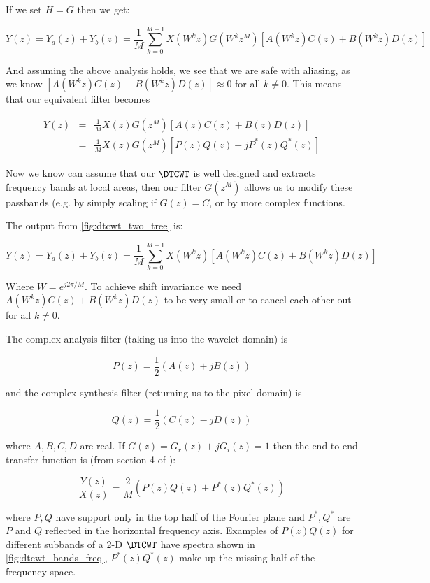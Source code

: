 If we set $H=G$ then we get:

$$Y(z) = Y_{a}(z) + Y_{b}(z) = \frac{1}{M} \sum_{k=0}^{M-1} X(W^k z)G(W^kz^{M}) [A(W^kz)C(z) + B(W^kz)D(z)]$$

And assuming the above analysis holds, we see that we are safe with aliasing, as
we know $[A(W^kz)C(z) + B(W^kz)D(z)] \approx 0$ for all $k\neq 0$. This means
that our equivalent filter becomes

\begin{eqnarray}
  Y(z) &=& \frac{1}{M} X(z)G(z^{M}) [A(z)C(z) + B(z)D(z)] \\
  &=& \frac{1}{M} X(z)G(z^{M}) [P(z)Q(z) + jP^{*}(z)Q^{*}(z)]
\end{eqnarray}

Now we know can assume that our $\DTCWT$ is well designed and extracts frequency
bands at local areas, then our filter $G(z^{M})$ allows us to modify these
passbands (e.g. by simply scaling if $G(z) = C$, or by more complex functions.


The output from \autoref{fig:dtcwt_two_tree} is:

$$ Y(z) = Y_a(z) + Y_b(z) = \frac{1}{M}\sum_{k=0}^{M-1} X\left(W^k z\right)
  \left[ A\left(W^kz\right)C(z) + B\left(W^kz\right)D(z) \right] $$

Where $W=e^{j2\pi/M}$.  To achieve shift invariance we need 
$A\left(W^kz\right)C(z) + B\left(W^kz\right)D(z)$ to be very small or to cancel
each other out for all $k \neq 0$.

The complex analysis filter (taking us into the wavelet domain) is 

$$P(z) = \frac{1}{2}\left(A(z)+jB(z)\right)$$

and the complex synthesis filter (returning us to the pixel domain) is 

$$Q(z) = \frac{1}{2}\left(C(z) - jD(z)\right)$$

where $A,B,C,D$ are real.  If $G(z) = G_r(z) + jG_i(z) = 1$ then the end-to-end
transfer function is (from section 4 of \cite{kingsbury_complex_2001}):

\begin{equation}\label{eq:end_to_end1}
\frac{Y(z)}{X(z)} = \frac{2}{M}\left(P(z)Q(z) + P^*(z)Q^*(z)\right)
\end{equation}

where $P, Q$ have support only in the top half of the Fourier plane and $P^*,
Q^*$ are $P$ and $Q$ reflected in the horizontal frequency axis. Examples of
$P(z)Q(z)$ for different subbands of a 2-D $\DTCWT$ have spectra shown in
\autoref{fig:dtcwt_bands_freq}, $P^*(z)Q^*(z)$ make up the missing half of the
frequency space.\\


